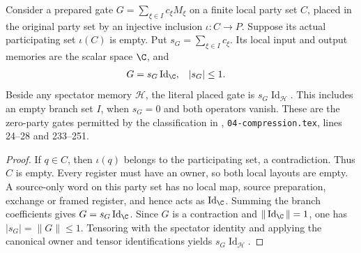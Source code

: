 \begin{theorem}
    \label{thm:peps_empty_party_gate_scalar}
    \leanok
    Consider a prepared gate $G=\sum_{\xi\in I}c_\xi M_\xi$ on a finite
    local party set $C$, placed in the original party set by an injective
    inclusion $\iota:C\to P$. Suppose its actual participating set
    $\iota(C)$ is empty. Put $s_G=\sum_{\xi\in I}c_\xi$. Its local input
    and output memories are the scalar space $\C$, and
    \begin{align}
        G&=s_G\operatorname{Id}_{\C}, & |s_G|&\le1.
        \label{eq:peps_empty_gate_scalar}
    \end{align}
    Beside any spectator memory $\mathcal H$, the literal placed gate is
    $s_G\operatorname{Id}_{\mathcal H}$. This includes an empty branch
    set $I$, when $s_G=0$ and both operators vanish.
    These are the zero-party gates permitted by the classification in
    \cite[proof of Theorem~5.2]{OpenAI2026PolynomialPEPS},
    \texttt{04-compression.tex}, lines 24--28 and 233--251.
\end{theorem}

\begin{proof}\leanok
    If $q\in C$, then $\iota(q)$ belongs to the participating set, a
    contradiction. Thus $C$ is empty. Every register must have an owner,
    so both local layouts are empty. A source-only word on this party
    set has no local map, source preparation, exchange or framed
    register, and hence acts as $\operatorname{Id}_{\C}$. Summing the
    branch coefficients gives $G=s_G\operatorname{Id}_{\C}$. Since
    $G$ is a contraction and $\|\operatorname{Id}_{\C}\|=1$, one has
    $|s_G|=\|G\|\le1$. Tensoring with the spectator identity and applying
    the canonical owner and tensor identifications yields
    $s_G\operatorname{Id}_{\mathcal H}$.
\end{proof}

